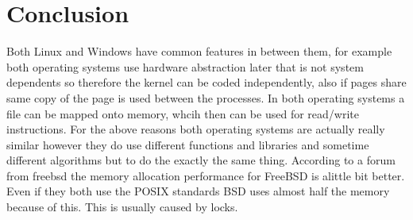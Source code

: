 \documentclass[letterpaper,10pt,draftclsnofoot,onecolumn]{IEEEtran}
\begin{document}
\section*{Conclusion}

Both Linux and Windows have common features in between them, for example both operating systems use hardware abstraction later that is not system dependents so therefore the kernel can be coded independently, also if pages share same copy of the page is used between the processes. In both operating systems a file can be mapped onto memory, whcih then can be used for read/write instructions. For the above reasons both operating systems are actually really similar however they do use different functions and libraries and sometime different algorithms but to do the exactly the same thing. According to a forum from freebsd the memory allocation performance for FreeBSD is alittle bit better. Even if they both use the POSIX standards BSD uses almost half the memory because of this. This is usually caused by locks.




\end{document}
